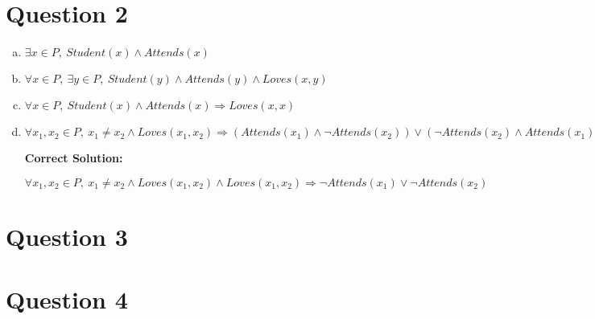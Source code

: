\documentclass[12pt]{article}
\begin{document}
\section*{Question 2}
\begin{enumerate}[a.]
    \item

    $\exists x \in P,\: Student(x) \land Attends(x)$

    \item

    $\forall x \in P,\:\exists y \in P,\:Student(y) \land Attends(y) \land Loves(x,y)$

    \item

    $\forall x \in P,\: Student(x) \land Attends(x) \Rightarrow Loves(x,x)$

    \item

    $\forall x_1,x_2 \in P,\:x_1 \neq x_2 \land Loves(x_1,x_2) \Rightarrow
    (Attends(x_1) \land \neg Attends(x_2)) \lor (\neg Attends(x_2) \land Attends(x_1))$

    \bigskip

    \textbf{Correct Solution:}

    $\forall x_1,x_2 \in P,\:x_1 \neq x_2 \land Loves(x_1,x_2) \land Loves(x_1,x_2) \Rightarrow
    \neg Attends(x_1) \lor \neg Attends(x_2)$

\end{enumerate}


\section*{Question 3}

\section*{Question 4}
\end{document}
